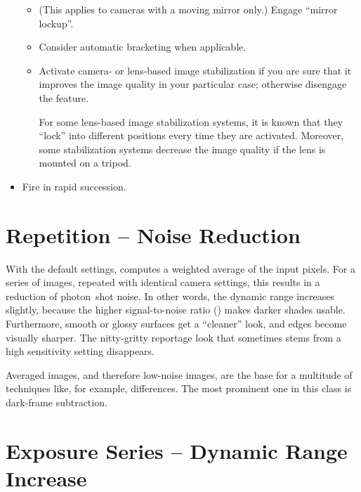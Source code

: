 \begin{itemize}
\begin{itemize}
  \item
    (This applies to cameras with a moving mirror only.)  Engage ``mirror lockup''.

  \item
    Consider automatic bracketing when applicable.

  \item
    Activate camera- or lens-based image stabilization if you are sure that it improves the
    image quality in your particular case; otherwise disengage the feature.

    For some lens-based image stabilization systems, it is known that they ``lock'' into
    different positions every time they are activated.  Moreover, some stabilization systems
    decrease the image quality if the lens is mounted on a tripod.
  \end{itemize}

\item
  Fire in rapid succession.
\end{itemize}




\section[Repetition -- Noise Reduction]{\label{sec:repetition}%
  Repetition -- Noise Reduction}


With the default settings, \App{} computes a weighted average of the input pixels.  For a series
of images, repeated with identical camera settings, this results in a reduction of photon~shot
noise.  In other words, the dynamic range increases slightly, because the higher signal-to-noise
ratio () makes darker shades usable.  Furthermore, smooth or glossy surfaces get a
``cleaner'' look, and edges become visually sharper.  The nitty-gritty reportage look that
sometimes stems from a high sensitivity setting disappears.

%
Averaged images, and therefore low-noise images, are the base for a multitude of techniques
like, for example, differences.  The most prominent one in this class is dark-frame subtraction.


\section[Exposure Series -- Dynamic Range Increase]{\label{sec:exposure-series--dynamic-range-increase}%
  Exposure Series -- Dynamic Range Increase}

